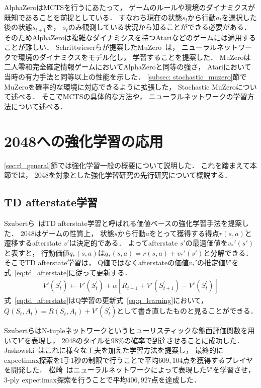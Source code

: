 AlphaZeroはMCTSを行うにあたって， ゲームのルールや環境のダイナミクスが既知であることを前提としている．
すなわち現在の状態$s_t$から行動$a_t$を選択した後の状態$s_{t+1}$を， $s_t$のみ観測している状況から知ることができる必要がある．
そのためAlphaZeroは複雑なダイナミクスを持つAtariなどのゲームには適用することが難しい．
Schrittwieserらが提案したMuZero~\cite{MuZero}は， ニューラルネットワークで環境のダイナミクスをモデル化し， 学習することを提案した．
MuZeroは二人零和完全確定情報ゲームにおいてAlphaZeroと同等の強さ， Atariにおいて当時の有力手法と同等以上の性能を示した．
\ref{subsec: stochastic_muzero}節でMuZeroを確率的な環境に対応できるように拡張した， Stochastic MuZeroについて述べる．
そこでMCTSの具体的な方法や， ニューラルネットワークの学習方法について述べる．

\section{2048への強化学習の応用}
\label{sec:rlto2048}
\ref{sec:rl_general}節では強化学習一般の概要について説明した．
これを踏まえて本節では， 2048を対象とした強化学習研究の先行研究について概説する．

\subsection{TD afterstate学習}
\label{subsec: td_afterstate}
Szubertら~\cite{Szubert}はTD afterstate学習と呼ばれる価値ベースの強化学習手法を提案した．
2048はゲームの性質上， 状態$s$から行動$a$をとって獲得する得点$r(s,a)$と遷移するafterstate $s'$は決定的である．
よってafterstate $s'$の最適価値を$v_*'(s')$と表すと， 行動価値$q_*(s,a)$は$q_*(s,a) = r(s,a) + v_*'(s')$と分解できる．
そこでTD afterstate学習は， Q値ではなくafterstateの価値$v_*'$の推定値$V'$を式~\ref{eq:td_afterstate}に従って更新する．
\begin{align}
  \label{eq:td_afterstate}
  V'(S_{t}^{'}) \leftarrow  V'(S_{t}^{'}) + \alpha [R_{t+1} + V'(S_{t+1}^{'}) - V'(S_{t}^{'})]
\end{align}
式~\ref{eq:td_afterstate}はQ学習の更新式~\ref{eq:q_learning}において， $Q(S_t, A_t) = R(S_t, A_t) + V'(S_{t}^{'})$として書き直したものと見ることができる．

SzubertらはN-tupleネットワークというヒューリスティックな盤面評価関数を用いて$V'$を表現し， $2048$のタイルを$98$\%の確率で到達させることに成功した．
Jaskowski~\cite{DBLP:journals/corr/Jaskowski16}はこれに様々な工夫を加えた学習方法を提案し， 最終的にexpectimax探索を$1$手$1$秒の制限で行うことで平均$609,104$点を獲得するプレイヤを開発した．
松崎~\cite{KiminoriMatsuzaki2021}はニューラルネットワークによって表現した$V'$を学習させ， $3$-ply expectimax探索を行うことで平均$406,927$点を達成した．


